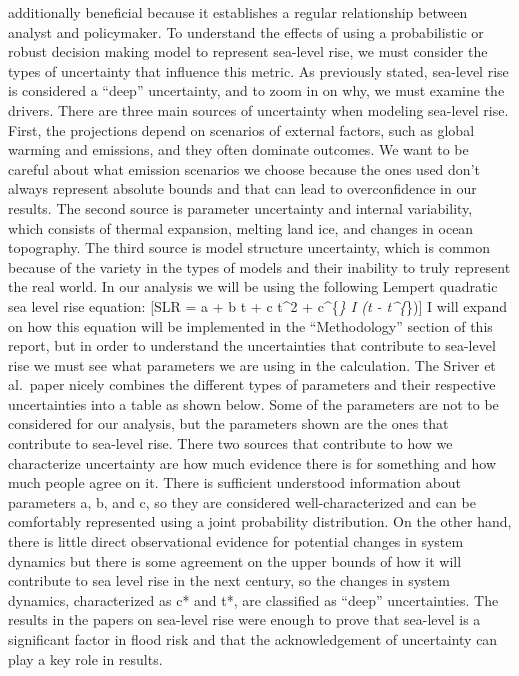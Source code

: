 \documentclass[
  11pt,
]{article}
\begin{document}
additionally beneficial because it establishes a regular relationship
between analyst and policymaker. To understand the effects of using a
probabilistic or robust decision making model to represent sea-level
rise, we must consider the types of uncertainty that influence this
metric. As previously stated, sea-level rise is considered a ``deep''
uncertainty, and to zoom in on why, we must examine the drivers. There
are three main sources of uncertainty when modeling sea-level rise.
First, the projections depend on scenarios of external factors, such as
global warming and emissions, and they often dominate outcomes. We want
to be careful about what emission scenarios we choose because the ones
used don't always represent absolute bounds and that can lead to
overconfidence in our results. The second source is parameter
uncertainty and internal variability, which consists of thermal
expansion, melting land ice, and changes in ocean topography. The third
source is model structure uncertainty, which is common because of the
variety in the types of models and their inability to truly represent
the real world. In our analysis we will be using the following Lempert
quadratic sea level rise equation: {[}SLR = a + b t + c t\^{}2 +
c\^{}\{\emph{\} I (t - t\^{}\{}\}){]} I will expand on how this equation
will be implemented in the ``Methodology'' section of this report, but
in order to understand the uncertainties that contribute to sea-level
rise we must see what parameters we are using in the calculation. The
Sriver et al.~paper nicely combines the different types of parameters
and their respective uncertainties into a table as shown below. Some of
the parameters are not to be considered for our analysis, but the
parameters shown are the ones that contribute to sea-level rise. There
two sources that contribute to how we characterize uncertainty are how
much evidence there is for something and how much people agree on it.
There is sufficient understood information about parameters a, b, and c,
so they are considered well-characterized and can be comfortably
represented using a joint probability distribution. On the other hand,
there is little direct observational evidence for potential changes in
system dynamics but there is some agreement on the upper bounds of how
it will contribute to sea level rise in the next century, so the changes
in system dynamics, characterized as c* and t*, are classified as
``deep'' uncertainties. The results in the papers on sea-level rise were
enough to prove that sea-level is a significant factor in flood risk and
that the acknowledgement of uncertainty can play a key role in results.
\end{document}
